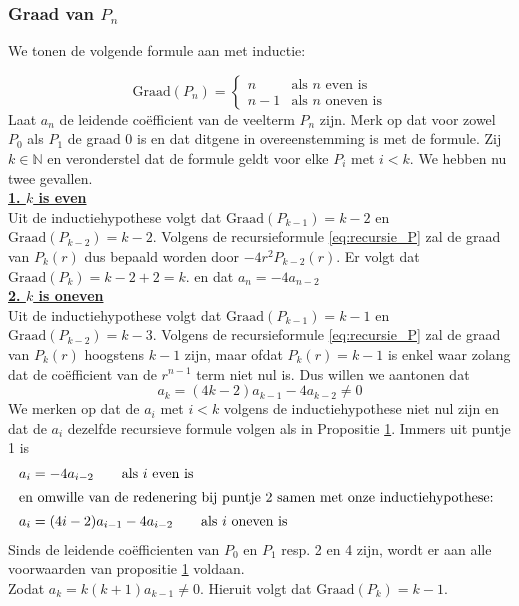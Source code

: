 \documentclass[12pt,a4paper]{article}
\theoremstyle{definition}
\numberwithin{equation}{section}
\begin{document}
\subsubsection*{Graad van $P_n$}
We tonen de volgende formule aan met inductie: 

\begin{equation*}
\text{Graad$(P_n)=$}
\begin{cases}
n & \text{als $n$ even is}\\
n-1 & \text{als $n$ oneven is}
\end{cases}
\end{equation*}
Laat $a_n$ de leidende coëfficient van de veelterm $P_n$ zijn.
Merk op dat voor zowel $P_0$ als $P_1$ de graad 0 is en dat ditgene in overeenstemming is met de formule.
Zij $k\in\mathbb{N}$ en veronderstel dat de formule geldt voor elke $P_i$ met $i<k$. We hebben nu twee gevallen.\\
%
\underline{\textbf{1. $k$ is even}}\\
Uit de inductiehypothese volgt dat $\text{Graad}(P_{k-1}) = k-2$ en $\text{Graad}(P_{k-2}) = k-2$.
Volgens de recursieformule \eqref{eq:recursie_P} zal de graad van $P_k(r)$ dus bepaald worden door $-4r^2P_{k-2}(r)$. Er volgt dat $\text{Graad}(P_k) = k-2+2 = k.$ en dat $a_n=-4a_{n-2}$
\\
\underline{\textbf{2. $k$ is oneven}}\\
Uit de inductiehypothese volgt dat $\text{Graad}(P_{k-1}) = k-1$ en $\text{Graad}(P_{k-2}) = k-3$.
Volgens de recursieformule \eqref{eq:recursie_P} zal de graad van $P_k(r)$ hoogstens $k-1$ zijn, maar ofdat $P_k(r)=k-1$ is enkel waar zolang dat de coëfficient van de $r^{n-1}$ term niet nul is. Dus willen we aantonen dat
$$a_k=(4k-2)a_{k-1}-4a_{k-2}\neq0$$
We merken op dat de $a_i$ met $i<k$ volgens de inductiehypothese niet nul zijn en dat de $a_i$ dezelfde recursieve formule volgen als in Propositie \hyperref[thm:prop1]{1}. Immers uit puntje 1 is
\begin{align*}
a_i&=-4a_{i-2} \qquad \text{als $i$ even is} \\
\intertext{en omwille van de redenering bij puntje $2$ samen met onze inductiehypothese: }
a_i&=(4i-2)a_{i-1}-4a_{i-2} \qquad \text{als $i$ oneven is}
\end{align*}
Sinds de leidende coëfficienten van $P_0$ en $P_1$ resp. 2 en 4 zijn, wordt er aan alle voorwaarden van propositie \hyperref[thm:prop1]{1} voldaan. \\
Zodat $a_k = k(k+1)a_{k-1} \neq 0$.
Hieruit volgt dat $\text{Graad}(P_k) = k-1$.
\end{document}
